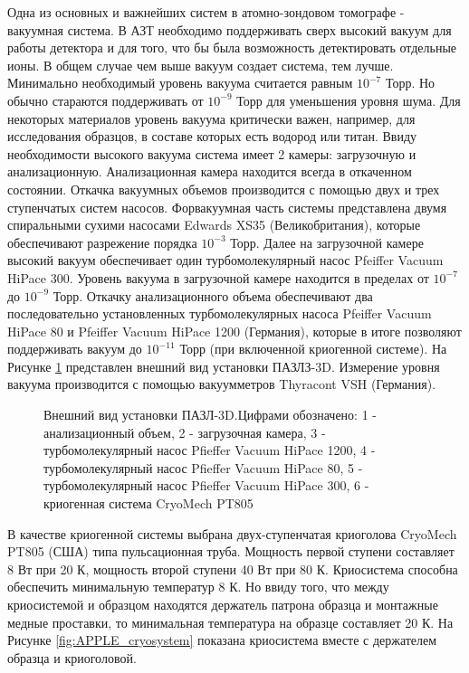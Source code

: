 Одна из основных и важнейших систем в атомно-зондовом томографе - вакуумная система. В АЗТ необходимо поддерживать сверх высокий вакуум для работы детектора и для того, что бы была возможность детектировать отдельные ионы. В общем случае чем выше вакуум создает система, тем лучше. Минимально необходимый уровень вакуума считается равным $10^{-7}$ Торр. Но обычно стараются поддерживать от $10^{-9}$ Торр для уменьшения уровня шума. Для некоторых материалов уровень вакуума критически важен, например, для исследования образцов, в составе которых есть водород или титан.
Ввиду необходимости высокого вакуума система имеет 2 камеры: загрузочную и анализационную. Анализационная камера находится всегда в откаченном состоянии. Откачка вакуумных объемов производится с помощью двух и трех ступенчатых систем насосов. Форвакуумная часть системы представлена двумя спиральными сухими насосами Edwards XS35 (Великобритания), которые обеспечивают разрежение порядка $10^{-3}$ Торр. Далее на загрузочной камере высокий вакуум обеспечивает один турбомолекулярный насос Pfeiffer Vacuum HiPace 300. Уровень вакуума в загрузочной камере находится в пределах от $10^{-7}$ до $10^{-9}$ Торр. Откачку анализационного объема обеспечивают два последовательно установленных турбомолекулярных насоса Pfeiffer Vacuum HiPace 80 и Pfeiffer Vacuum HiPace 1200 (Германия), которые в итоге позволяют поддерживать вакуум до $10^{-11}$ Торр (при включенной криогенной системе). На Рисунке \cref{fig:APPLE_foto_main} представлен внешний вид установки ПАЗЛЗ-3D. Измерение уровня вакуума производится с помощью вакуумметров Thyracont VSH (Германия).

\begin{figure}[htb]
	\caption{Внешний вид установки ПАЗЛ-3D.Цифрами обозначено: 1 - анализационный объем, 2 - загрузочная камера, 3 - турбомолекулярный насос Pfieffer Vacuum HiPace 1200, 4 - турбомолекулярный насос Pfieffer Vacuum HiPace 80, 5 - турбомолекулярный насос Pfieffer Vacuum HiPace 300, 6 - криогенная система CryoMech PT805}
	\label{fig:APPLE_foto_main}
\end{figure}

\FloatBarrier
В качестве криогенной системы выбрана двух-ступенчатая криоголова CryoMech PT805 (США)  типа пульсационная труба. Мощность первой ступени составляет 8 Вт при 20 К, мощность второй ступени 40 Вт при 80 К. Криосистема способна обеспечить минимальную температур 8 К. Но ввиду того, что между криосистемой и образцом находятся держатель патрона образца и монтажные медные проставки, то минимальная температура на образце составляет 20 К. На Рисунке \cref{fig:APPLE_cryosystem} показана криосистема вместе с держателем образца и криоголовой.

